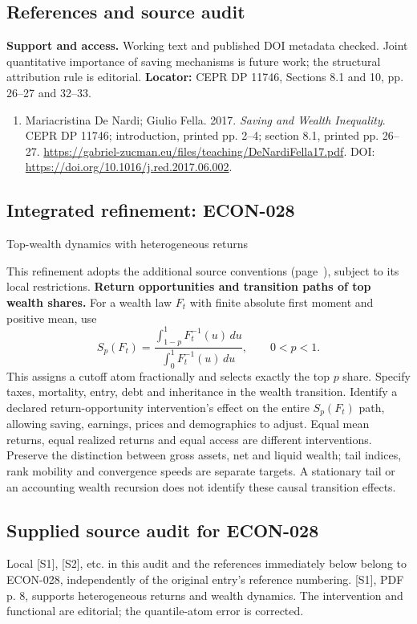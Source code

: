 \documentclass[11pt,a4paper]{article}
\begin{document}
\subsection*{References and source audit}
\textbf{Support and access.} Working text and published DOI metadata checked. Joint quantitative importance of saving mechanisms is future work; the structural attribution rule is editorial. \textbf{Locator:} CEPR DP 11746, Sections 8.1 and 10, pp. 26--27 and 32--33.
\begin{enumerate}\raggedright
\item\hypertarget{definitions:source:30007644:1}{} Mariacristina De Nardi; Giulio Fella. 2017. \emph{Saving and Wealth Inequality}. CEPR DP 11746; introduction, printed pp. 2–4; section 8.1, printed pp. 26–27.
\url{https://gabriel-zucman.eu/files/teaching/DeNardiFella17.pdf}.
DOI: \url{https://doi.org/10.1016/j.red.2017.06.002}.
\end{enumerate}

\subsection*{Integrated refinement: ECON-028}
{\sffamily\small\color{muted}Top-wealth dynamics with heterogeneous returns\par}
This refinement adopts the additional source conventions
(page~\pageref{audited:conventions}), subject to its local restrictions.
\textbf{Return opportunities and transition paths of top wealth shares.}
For a wealth law $F_t$ with finite absolute first moment and positive mean, use
\[
S_p(F_t)=\frac{\int_{1-p}^{1}F_t^{-1}(u)\,du}
                   {\int_0^1F_t^{-1}(u)\,du},\qquad 0<p<1.
\]
This assigns a cutoff atom fractionally and selects exactly the top $p$ share.
Specify taxes, mortality, entry, debt and inheritance in the wealth transition.
Identify a declared return-opportunity intervention's effect on the entire
$S_p(F_t)$ path, allowing saving, earnings, prices and demographics to adjust.
Equal mean returns, equal realized returns and equal access are different
interventions. Preserve the distinction between gross assets, net and liquid
wealth; tail indices, rank mobility and convergence speeds are separate targets.
A stationary tail or an accounting wealth recursion does not identify these
causal transition effects.
\subsection*{Supplied source audit for ECON-028}
Local [S1], [S2], etc. in this audit and the references immediately below
belong to ECON-028, independently of the original entry's reference numbering.
[S1], PDF p. 8, supports heterogeneous returns and wealth dynamics. The intervention and functional are editorial; the quantile-atom error is corrected.
\end{document}

